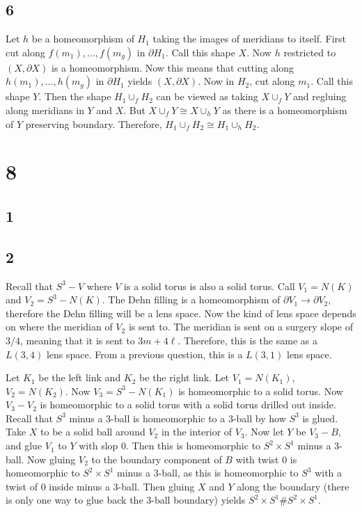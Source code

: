 \documentclass{article}
\theoremstyle{definition}
\numberwithin{theorem}{section}
\numberwithin{equation}{section}
\begin{document}
\subsection{6}

Let $h$ be a homeomorphism of $H_1$ taking the images of meridians to itself. First cut along $f(m_1), ..., f(m_g)$ in $\partial H_1$. Call this shape $X$. Now $h$ restricted to $(X, \partial X)$ is a homeomorphism. Now this means that cutting along $h(m_1), ..., h(m_g)$ in $\partial H_1$ yields $(X, \partial X)$. 
Now in $H_2$, cut along $m_1$. Call this shape $Y$. Then the shape $H_1 \cup_f H_2$ can be viewed as taking $X \cup_f Y$ and regluing along meridians in $Y$ and $X$. But $X \cup_f Y \cong X \cup_h Y$ as there is a homeomorphism of $Y$ preserving boundary. Therefore, $H_1 \cup_f H_2 \cong H_1 \cup_h H_2$. 


\section{8}

\subsection{1}

\subsection{2}
Recall that $S^3 - V$ where $V$ is a solid torus is also a solid torus. Call $V_1 = N(K)$ and $V_2 = S^3 - N(K)$. The Dehn filling is a homeomorphism of $\partial V_1 \rightarrow \partial V_2$, therefore the Dehn filling will be a lens space. Now the kind of lens space depends on where the meridian of $V_2$ is sent to. The meridian is sent on a surgery slope of $3/4$, meaning that it is sent to $3m + 4 \ell$. Therefore, this is the same as a $L(3,4)$ lens space. From a previous question, this is a $L(3, 1)$ lens space. 

Let $K_1$ be the left link and $K_2$ be the right link. Let $V_1 = N(K_1)$, $V_2 = N(K_2)$. Now $V_3 = S^3 - N(K_1)$ is homeomorphic to a solid torus. Now $V_3 - V_2$ is homeomorphic to a solid torus with a solid torus drilled out inside. Recall that $S^3$ minus a 3-ball is homeomorphic to a 3-ball by how $S^3$ is glued. Take $X$ to be a solid ball around $V_2$ in the interior of $V_3$. Now let $Y$ be $V_3 - B$, and glue $V_1$ to $Y$ with slop $0$. Then this is homeomorphic to $S^2 \times S^1$ minus a $3$-ball. Now gluing $V_2$ to the boundary component of $B$ with twist 0 is homeomorphic to $S^2 \times S^1$ minus a $3$-ball, as this is homeomorphic to $S^3$ with a twist of $0$ inside minus a $3$-ball. Then gluing $X$ and $Y$ along the boundary (there is only one way to glue back the 3-ball boundary) yields $S^2 \times S^1 \# S^2 \times S^1$. 
\end{document}
